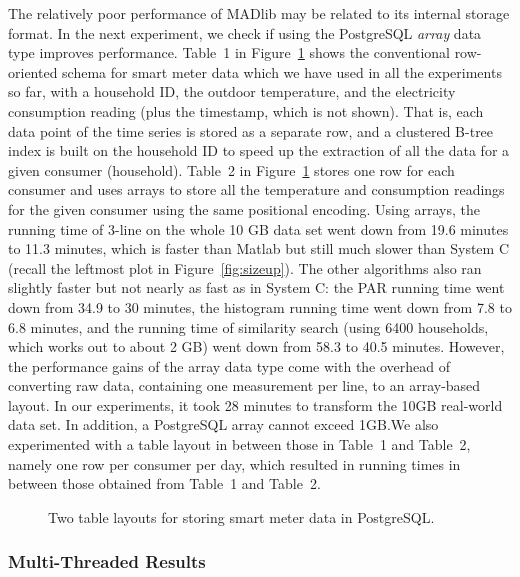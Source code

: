 \documentclass[prodmode,acmtods]{acmsmall}
\begin{document}
The relatively poor performance of MADlib may be related to its internal storage format.  In the next experiment, we check if using the PostgreSQL \emph{array} data type improves performance.  Table~1 in Figure~\ref{fig:dbschema} shows the conventional row-oriented schema for smart meter data which we have used in all the experiments so far, with a household ID, the outdoor temperature, and the electricity consumption reading (plus the timestamp, which is not shown).  That is, each data point of the time series is stored as a separate row, and a clustered B-tree index is built on the household ID to speed up the extraction of all the data for a given consumer (household).  Table~2 in Figure~\ref{fig:dbschema} stores one row for each consumer and uses arrays to store all the temperature and consumption readings for the given consumer using the same positional encoding.  Using arrays, the running time of 3-line on the whole 10 GB data set went down from 19.6 minutes to 11.3 minutes, which is faster than Matlab but still much slower than System C (recall the leftmost plot in Figure~\ref{fig:sizeup}).  The other algorithms also ran slightly faster but not nearly as fast as in System C: the PAR running time went down from 34.9 to 30 minutes, the histogram running time went down from 7.8 to 6.8 minutes, and the running time of similarity search (using 6400 households, which works out to about 2 GB) went down from 58.3 to 40.5 minutes.  However, the performance gains of the array data type come with the overhead of converting raw data, containing one measurement per line, to an array-based layout.  In our experiments, it took 28 minutes to transform the 10GB real-world data set.  In addition, a PostgreSQL array cannot exceed 1GB.We also experimented with a table layout in between those in Table~1 and Table~2, namely one row per consumer per day, which resulted in running times in between those obtained from Table~1 and Table~2.

\begin{figure}
\centering
{}
\caption{Two table layouts for storing smart meter data in PostgreSQL.}
\label{fig:dbschema}
\end{figure}


\subsubsection{Multi-Threaded Results}
\label{sec:multiprocessinaserver}
\end{document}
